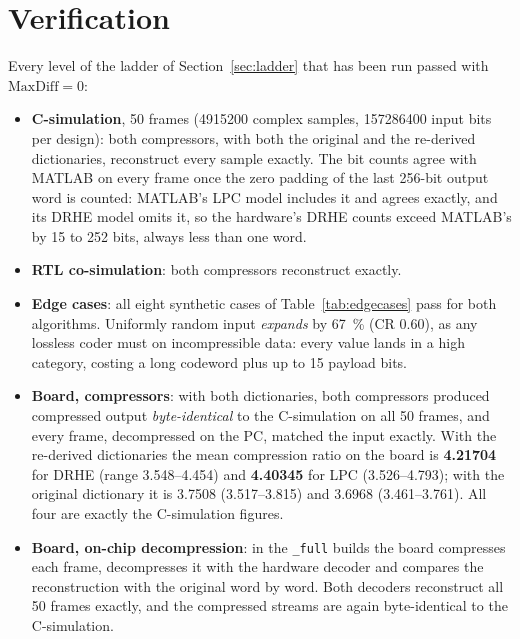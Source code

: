 \section{Verification}
\label{sec:verifres}

Every level of the ladder of Section~\ref{sec:ladder} that has been run
passed with $\mathrm{MaxDiff} = 0$:

\begin{itemize}
\item \textbf{C-simulation}, 50 frames (\num{4915200} complex samples,
\num{157286400} input bits per design): both compressors, with both the
original and the re-derived dictionaries, reconstruct every sample exactly. The
bit counts agree with MATLAB on every frame once the zero padding of the last
256-bit output word is counted: MATLAB's LPC model includes it and agrees
exactly, and its DRHE model omits it, so the hardware's DRHE counts exceed
MATLAB's by 15 to 252 bits, always less than one word.
\item \textbf{RTL co-simulation}: both compressors reconstruct exactly.
\item \textbf{Edge cases}: all eight synthetic cases of
Table~\ref{tab:edgecases} pass for both algorithms. Uniformly random input
\emph{expands} by \SI{67}{\percent} (CR \num{0.60}), as any lossless coder must
on incompressible data: every value lands in a high category, costing a long
codeword plus up to 15 payload bits.
\item \textbf{Board, compressors}: with both dictionaries, both compressors
produced compressed output \emph{byte-identical} to the C-simulation on all 50
frames, and every frame, decompressed on the PC, matched the input exactly.
With the re-derived dictionaries the mean compression ratio on the board is
\textbf{\num{4.21704}} for DRHE (range \numrange{3.548}{4.454}) and
\textbf{\num{4.40345}} for LPC (\numrange{3.526}{4.793}); with the original
dictionary it is \num{3.7508} (\numrange{3.517}{3.815}) and \num{3.6968}
(\numrange{3.461}{3.761}). All four are exactly the C-simulation figures.
\item \textbf{Board, on-chip decompression}: in the \texttt{\_full} builds
the board compresses each frame, decompresses it with the hardware decoder and
compares the reconstruction with the original word by word. Both decoders
reconstruct all 50 frames exactly, and the compressed streams are again
byte-identical to the C-simulation.
\end{itemize}

